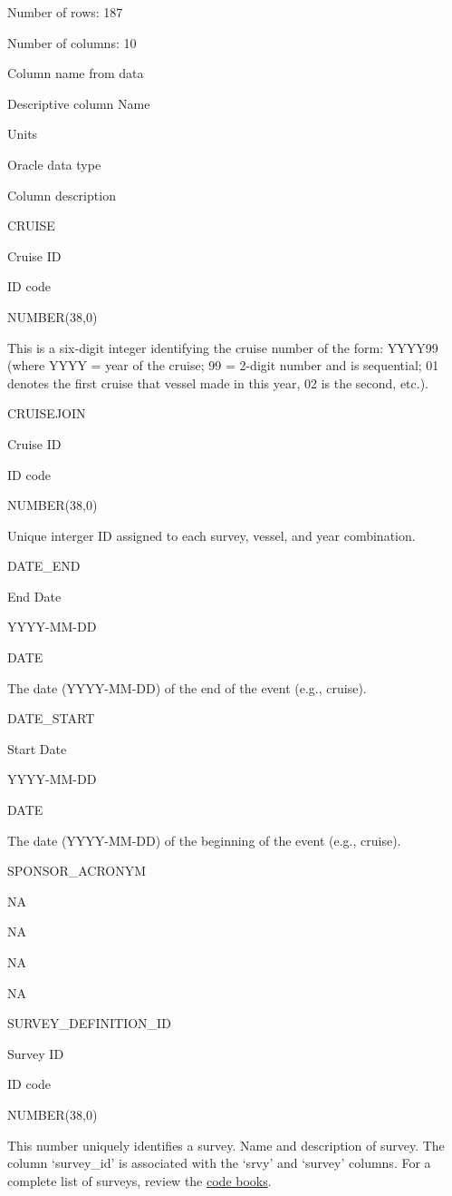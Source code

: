 \documentclass[
  letterpaper,
  oneside,
  open=any]{scrbook}
\begin{document}
Number of rows: 187

Number of columns: 10

Column name from data

Descriptive column Name

Units

Oracle data type

Column description

CRUISE

Cruise ID

ID code

NUMBER(38,0)

This is a six-digit integer identifying the cruise number of the form:
YYYY99 (where YYYY = year of the cruise; 99 = 2-digit number and is
sequential; 01 denotes the first cruise that vessel made in this year,
02 is the second, etc.).

CRUISEJOIN

Cruise ID

ID code

NUMBER(38,0)

Unique interger ID assigned to each survey, vessel, and year
combination.

DATE\_END

End Date

YYYY-MM-DD

DATE

The date (YYYY-MM-DD) of the end of the event (e.g., cruise).

DATE\_START

Start Date

YYYY-MM-DD

DATE

The date (YYYY-MM-DD) of the beginning of the event (e.g., cruise).

SPONSOR\_ACRONYM

NA

NA

NA

NA

SURVEY\_DEFINITION\_ID

Survey ID

ID code

NUMBER(38,0)

This number uniquely identifies a survey. Name and description of
survey. The column `survey\_id' is associated with the `srvy' and
`survey' columns. For a complete list of surveys, review the
\href{https://www.fisheries.noaa.gov/resource/document/groundfish-survey-species-code-manual-and-data-codes-manual}{code
books}.
\end{document}
